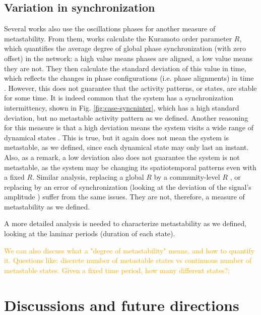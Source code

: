 \documentclass[preprint,superscriptaddress,showpacs,amsmath,amssymb,aps,pre,floatfix]{revtex4-1}
\theoremstyle{definition}
\begin{document}
\subsection{Variation in synchronization}
Several works also use the oscillations phases for another measure of metastability. From them, works calculate the Kuramoto order parameter $R$, which quantifies the average degree of global phase synchronization (with zero offset) in the network: a high value means phases are aligned, a low value means they are not. They then calculate the standard deviation of this value in time, which reflects the changes in phase configurations (i.e. phase alignments) in time \cite{deco_2017, lee_2017, alderson_2020, deco_2017, wildie_2012}.  However, this does not guarantee that the activity patterns, or states, are stable for some time. It is indeed common that the system has a synchronization intermittency, shown in Fig. \ref{fig:case-syncninter}, which has a high standard deviation, but no metastable activity pattern as we defined. 
Another reasoning for this measure is that a high deviation means the system visits a wide range of dynamical states \cite{cordova-palomera_2017}. This is true, but it again does not mean the system is metastable, as we defined, since each dynamical state may only last an instant. Also, as a remark, a low deviation also does not guarantee the system is not metastable, as the system may be changing its spatiotemporal patterns even with a fixed $R$.
Similar analysis, replacing a global $R$ by a community-level $R$ \cite{shanahan_2010, vasa_2015}, or replacing by an error of synchronization (looking at the deviation of the signal's amplitude \cite{hellyer_2014}) suffer from the same issues. 
They are not, therefore, a measure of metastability as we defined. 

A more detailed analysis is needed to characterize metastability as we defined, looking at the laminar periods (duration of each state). 



\textcolor{orange}{We can also discuss what a "degree of metastability" means, and how to quantify it. Questions like:  discrete number of metastable states vs continuous number of metastable states. Given a fixed time period, how many different states?;}




\section{Discussions and future directions}



% 


\end{document}
